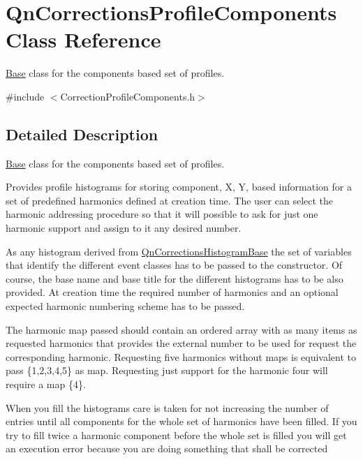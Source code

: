 \hypertarget{classQnCorrectionsProfileComponents}{}\section{Qn\+Corrections\+Profile\+Components Class Reference}
\label{classQnCorrectionsProfileComponents}


\mbox{\hyperlink{classBase}{Base}} class for the components based set of profiles.  




{\ttfamily \#include $<$Correction\+Profile\+Components.\+h$>$}



\subsection{Detailed Description}
\mbox{\hyperlink{classBase}{Base}} class for the components based set of profiles. 

Provides profile histograms for storing component, X, Y, based information for a set of predefined harmonics defined at creation time. The user can select the harmonic addressing procedure so that it will possible to ask for just one harmonic support and assign to it any desired number.

As any histogram derived from \mbox{\hyperlink{classQnCorrectionsHistogramBase}{Qn\+Corrections\+Histogram\+Base}} the set of variables that identify the different event classes has to be passed to the constructor. Of course, the base name and base title for the different histograms has to be also provided. At creation time the required number of harmonics and an optional expected harmonic numbering scheme has to be passed.

The harmonic map passed should contain an ordered array with as many items as requested harmonics that provides the external number to be used for request the corresponding harmonic. Requesting five harmonics without maps is equivalent to pass \{1,2,3,4,5\} as map. Requesting just support for the harmonic four will require a map \{4\}.

When you fill the histograms care is taken for not increasing the number of entries until all components for the whole set of harmonics have been filled. If you try to fill twice a harmonic component before the whole set is filled you will get an execution error because you are doing something that shall be corrected

